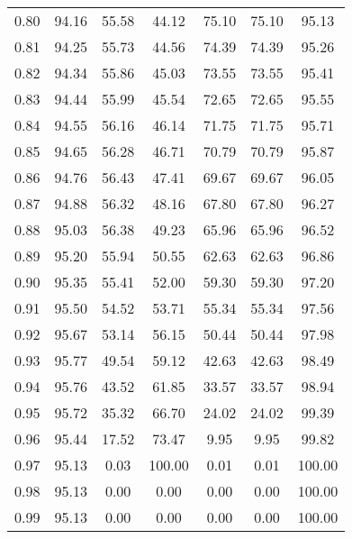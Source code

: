 \begin{tabular}{|c|c|c|c|c|c|c|}
      0.80 &     94.16 &     55.58 &      44.12 &   75.10 &      75.10 &         95.13 \\
      0.81 &     94.25 &     55.73 &      44.56 &   74.39 &      74.39 &         95.26 \\
      0.82 &     94.34 &     55.86 &      45.03 &   73.55 &      73.55 &         95.41 \\
      0.83 &     94.44 &     55.99 &      45.54 &   72.65 &      72.65 &         95.55 \\
      0.84 &     94.55 &     56.16 &      46.14 &   71.75 &      71.75 &         95.71 \\
      0.85 &     94.65 &     56.28 &      46.71 &   70.79 &      70.79 &         95.87 \\
      0.86 &     94.76 &     56.43 &      47.41 &   69.67 &      69.67 &         96.05 \\
      0.87 &     94.88 &     56.32 &      48.16 &   67.80 &      67.80 &         96.27 \\
      0.88 &     95.03 &     56.38 &      49.23 &   65.96 &      65.96 &         96.52 \\
      0.89 &     95.20 &     55.94 &      50.55 &   62.63 &      62.63 &         96.86 \\
      0.90 &     95.35 &     55.41 &      52.00 &   59.30 &      59.30 &         97.20 \\
      0.91 &     95.50 &     54.52 &      53.71 &   55.34 &      55.34 &         97.56 \\
      0.92 &     95.67 &     53.14 &      56.15 &   50.44 &      50.44 &         97.98 \\
      0.93 &     95.77 &     49.54 &      59.12 &   42.63 &      42.63 &         98.49 \\
      0.94 &     95.76 &     43.52 &      61.85 &   33.57 &      33.57 &         98.94 \\
      0.95 &     95.72 &     35.32 &      66.70 &   24.02 &      24.02 &         99.39 \\
      0.96 &     95.44 &     17.52 &      73.47 &    9.95 &       9.95 &         99.82 \\
      0.97 &     95.13 &      0.03 &     100.00 &    0.01 &       0.01 &        100.00 \\
      0.98 &     95.13 &      0.00 &       0.00 &    0.00 &       0.00 &        100.00 \\
      0.99 &     95.13 &      0.00 &       0.00 &    0.00 &       0.00 &        100.00 \\
\bottomrule
\end{tabular}
